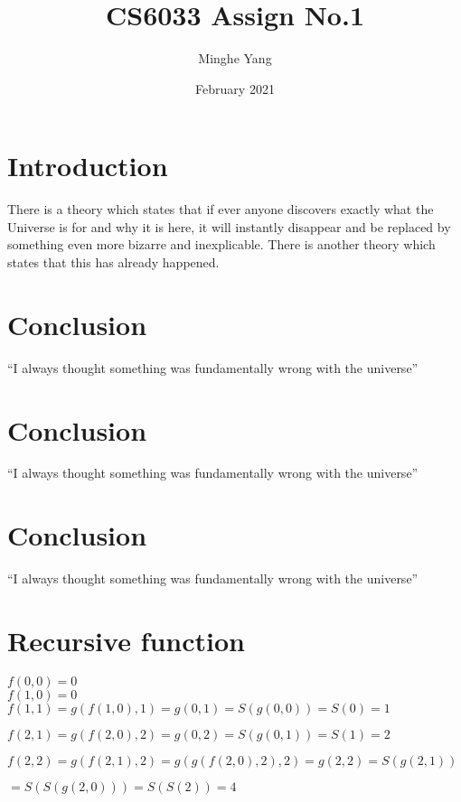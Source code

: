 \documentclass{article}
\title{CS6033 Assign No.1}
\author{Minghe Yang }
\date{February 2021}
\begin{document}
\renewcommand{\algorithmicrequire}{\textbf{Input:}} 
\renewcommand{\algorithmicensure}{\textbf{Output:}}
\maketitle

\section{Introduction}
There is a theory which states that if ever anyone discovers exactly what the Universe is for and why it is here, it will instantly disappear and be replaced by something even more bizarre and inexplicable.
There is another theory which states that this has already happened.

\section{Conclusion}
``I always thought something was fundamentally wrong with the universe''
\section{Conclusion}
``I always thought something was fundamentally wrong with the universe''
\section{Conclusion}
``I always thought something was fundamentally wrong with the universe''

\section{Recursive function}

$f(0,0) = 0$\\

$f(1,0) = 0$\\

$f(1,1) 
    = g(f(1,0),1)
    = g(0,1)
    = S(g(0,0))
    = S(0)
    = 1$

$f(2,1)
    = g(f(2,0),2)
    = g(0,2)
    = S(g(0,1)) 
    = S(1)
    = 2$
   
$f(2,2) 
    = g(f(2,1),2)
    = g(g(f(2,0),2),2)
    = g(2,2)
    = S(g(2,1))$
    
    $= S(S(g(2,0)))
    = S(S(2))
    = 4$
\end{document}
